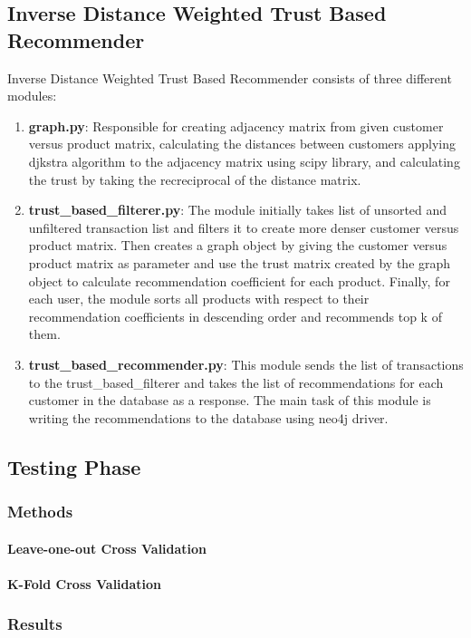 \documentclass[12pt]{article}
\begin{document}
\subsection{Inverse Distance Weighted Trust Based Recommender}
Inverse Distance Weighted Trust Based Recommender consists of three different modules: \\
\begin{enumerate}
\item \textbf{graph.py}: Responsible for creating adjacency matrix from given customer versus product matrix, calculating the distances between customers applying djkstra algorithm to the adjacency matrix using scipy library, and calculating the trust by taking the recreciprocal of the distance matrix.
\item \textbf{trust\_based\_filterer.py}: The module initially takes list of unsorted and unfiltered transaction list and filters it to create more denser customer versus product matrix. Then creates a graph object by giving the customer versus product matrix as parameter and use the trust matrix created by the graph object to calculate recommendation coefficient for each product. Finally, for each user, the module sorts all products with respect to their recommendation coefficients in descending order and recommends top k of them.
\item \textbf{trust\_based\_recommender.py}: This module sends the list of transactions to the trust\_based\_filterer and takes the list of recommendations for each customer in the database as a response. The main task of this module is writing the recommendations to the database using neo4j driver.
\end{enumerate}
\subsection{Testing Phase}
\subsubsection{Methods}
\paragraph{Leave-one-out Cross Validation}
\paragraph{K-Fold Cross Validation}
\subsubsection{Results}
\end{document}
